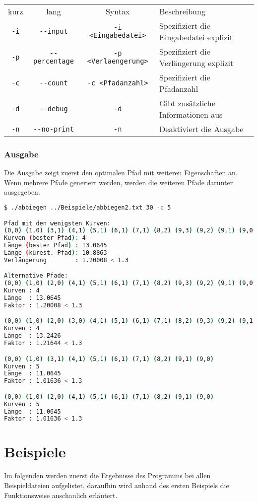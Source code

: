 \documentclass[a4paper,10pt,ngerman]{scrartcl}
\begin{document}
\begin{table}[ht]
  \centering
  \begin{tabular}{c|c|c|l}
    kurz & lang & Syntax & Beschreibung \\
    \texttt{-i} & \texttt{-{}-input} & \texttt{-i <Eingabedatei>} & Spezifiziert die Eingabedatei explizit \\
    \texttt{-p} & \texttt{-{}-percentage} & \texttt{-p <Verlaengerung>} & Spezifiziert die Verlängerung explizit \\
    \texttt{-c} & \texttt{-{}-count} & \texttt{-c <Pfadanzahl>} & Spezifiziert die Pfadanzahl \\
    \texttt{-d} & \texttt{-{}-debug} & \texttt{-d} & Gibt zusätzliche Informationen aus \\
    \texttt{-n} & \texttt{-{}-no-print} & \texttt{-n} & Deaktiviert die Ausgabe
  \end{tabular}
\end{table}

\subsubsection{Ausgabe}
Die Ausgabe zeigt zuerst den optimalen Pfad mit weiteren Eigenschaften an. Wenn mehrere Pfade generiert werden, werden die weiteren Pfade darunter ausgegeben.

\begin{lstlisting}[language=bash, numbers=none, frame=single]
$ ./abbiegen ../Beispiele/abbiegen2.txt 30 -c 5

Pfad mit den wenigsten Kurven:
(0,0) (1,0) (3,1) (4,1) (5,1) (6,1) (7,1) (8,2) (9,3) (9,2) (9,1) (9,0)
Kurven (bester Pfad): 4
Länge (bester Pfad) : 13.0645
Länge (kürest. Pfad): 10.8863
Verlängerung        : 1.20008 < 1.3

Alternative Pfade:
(0,0) (1,0) (2,0) (4,1) (5,1) (6,1) (7,1) (8,2) (9,3) (9,2) (9,1) (9,0)
Kurven : 4
Länge  : 13.0645
Faktor : 1.20008 < 1.3

(0,0) (1,0) (2,0) (3,0) (4,1) (5,1) (6,1) (7,1) (8,2) (9,3) (9,2) (9,1) (9,0)
Kurven : 4
Länge  : 13.2426
Faktor : 1.21644 < 1.3

(0,0) (1,0) (3,1) (4,1) (5,1) (6,1) (7,1) (8,2) (9,1) (9,0)
Kurven : 5
Länge  : 11.0645
Faktor : 1.01636 < 1.3

(0,0) (1,0) (2,0) (4,1) (5,1) (6,1) (7,1) (8,2) (9,1) (9,0)
Kurven : 5
Länge  : 11.0645
Faktor : 1.01636 < 1.3
\end{lstlisting}

\section{Beispiele}
Im folgenden werden zuerst die Ergebnisse des Programms bei allen Beispieldateien aufgelistet,
daraufhin wird anhand des ersten Beispiels die Funktionsweise anschaulich erläutert.
\end{document}
